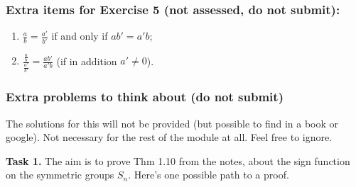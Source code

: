 \documentclass[
  12pt,
  a4paper,
  twoside]{article}
\theoremstyle{plain}
\theoremstyle{definition}
\begin{document}
\hypertarget{extra-items-for-exercise-5-not-assessed-do-not-submit}{%
\subsubsection*{Extra items for Exercise 5 (not assessed, do not submit):}\label{extra-items-for-exercise-5-not-assessed-do-not-submit}}

\begin{enumerate}
\def\labelenumi{(\roman{enumi})}
\setcounter{enumi}{2}
\item
  \(\displaystyle{\frac{a}{b} = \frac{a'}{b'}}\) if and only if \(ab' = a'b\);
\item
  \(\displaystyle{\frac{\frac{a}{b}}{\frac{a'}{b'}} = \frac{ab'}{a'b}}\) (if
  in addition \(a' \not= 0\)).
\end{enumerate}

\hypertarget{extra-problems-to-think-about-do-not-submit}{%
\subsubsection*{Extra problems to think about (do not submit)}\label{extra-problems-to-think-about-do-not-submit}}

The solutions for this will not be provided (but possible to find in a book or
google). Not necessary for the rest of the module at all. Feel free to ignore.

\textbf{Task 1.} The aim is to prove Thm 1.10 from the notes, about the sign
function on the symmetric groups \(S_n\). Here's one possible path to a proof.
\end{document}
